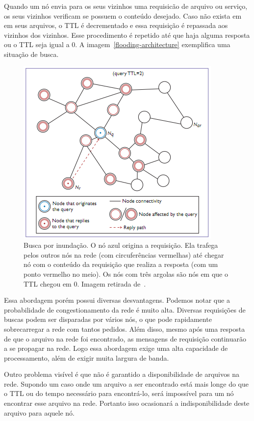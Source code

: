 Quando um nó envia para os seus vizinhos uma requisicão de arquivo ou serviço, os seus vizinhos verificam se possuem o conteúdo desejado. Caso não exista em em seus arquivos, o TTL é decrementado e essa requisição é repassada aos vizinhos dos vizinhos. Esse procedimento é repetido até que haja alguma resposta ou o TTL seja igual a 0. A imagem~\ref{flooding-architecture} exemplifica uma situação de busca.

\begin{figure}
	\centering
	\includegraphics[scale=0.75]{images/flooding-architecture.png}
	\caption{Busca por inundação. O nó azul origina a requisição. Ela trafega pelos outros nós na rede (com circuferências vermelhas) até chegar nó com o conteúdo da requisição que realiza a resposta (com um ponto vermelho no meio). Os nós com três argolas são nós em que o TTL chegou em 0. Imagem retirada de~\cite{dovalScalable01}.}
	\label{fig:flooding-architecture}
\end{figure}

Essa abordagem porém possui diversas desvantagens. Podemos notar que a probabilidade de congestionamento da rede é muito alta. Diversas requisições de buscas podem ser disparadas por vários nós, o que pode rapidamente sobrecarregar a rede com tantos pedidos. Além disso, mesmo após uma resposta de que o arquivo na rede foi encontrado, as mensagens de requisição continuarão a se propagar na rede. Logo essa abordagem exige uma alta capacidade de processamento, além de exigir muita largura de banda.

Outro problema visível é que não é garantido a disponibilidade de arquivos na rede. Supondo um caso onde um arquivo a ser encontrado está mais longe do que o TTL ou do tempo necessário para encontrá-lo, será impossível para um nó encontrar esse arquivo na rede. Portanto isso ocasionará a indisponibilidade deste arquivo para aquele nó.

